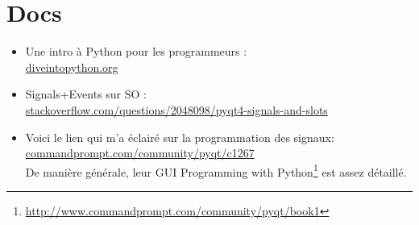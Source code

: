 \documentclass[11pt,a4paper]{article}
\begin{document}
\newpage

\section*{Docs}
\begin{itemize}
\item Une intro à Python pour les programmeurs :\\
  \url{diveintopython.org}

\item Signals+Events sur SO :\\
  \url{stackoverflow.com/questions/2048098/pyqt4-signals-and-slots}

\item Voici le lien qui m'a éclairé sur la programmation des signaux:\\ \url{commandprompt.com/community/pyqt/c1267}\\
  De manière générale, leur GUI Programming with Python\footnote{\url{http://www.commandprompt.com/community/pyqt/book1}} est assez détaillé.
\end{itemize}
\end{document}
